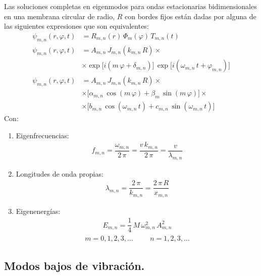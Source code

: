 Las soluciones completas en eigenmodos para ondas estacionarias bidimensionales en una membrana circular de radio, $R$ con bordes fijos están dadas por alguna de las siguientes expresiones que son equivalentes:
\begin{align*}
\psi_{m,n} (r ,\varphi, t) &= R_{m,n} (r) \, \Phi_{m} (\varphi) \, T_{m,n} (t) \\[0.5em] 
\psi_{m,n} (r ,\varphi, t) &= A_{m,n} \, J_{m,n} (k_{m,n} \, R) \times \\[0.5em]
&\times \exp\big[ i(m \, \varphi + \delta_{m,n}) \big] \, \exp\big[ i(\omega_{m,n} \, t + \varphi_{m,n}) \big] \\[0.5em]
\psi_{m,n} (r ,\varphi, t) &= A_{m,n} \, J_{m,n} (k_{m,n} \, R) \times \\[0.5em]
&\times \big[ \alpha_{m,n} \,  \cos (m \, \varphi) + \beta_{m} \, \sin (m \, \varphi) \big] \times \\[0.5em]
&\times \big[ b_{m,n} \,  \cos (\omega_{m,n} \, t) + c_{m,n} \, \sin (\omega_{m,n} \, t) \big]
\end{align*}   
Con:
\begin{enumerate}[label=\roman*)]
\item Eigenfrecuencias:
\begin{eqnarray*}
f_{m,n} = \dfrac{\omega_{m,n}}{2 \, \pi} =  \dfrac{v \, k_{m,n}}{2 \, \pi} =  \dfrac{v}{\lambda_{m,n}}
\end{eqnarray*}
\item Longitudes de onda propias:
\begin{eqnarray*}
\lambda_{m,n} = \dfrac{2 \, \pi}{k_{m,n}} =  \dfrac{2 \, \pi \, R}{x_{m,n}}
\end{eqnarray*}
\item Eigenenergías:
\begin{align*}
E_{m,n} = \dfrac{1}{4} \, M \, \omega_{m,n}^{2} \, A_{m,n}^{2}
\end{align*}
\begin{align*}
m = 0, 1, 2, 3, \ldots \hspace{1cm} n = 1, 2, 3, \ldots
\end{align*}
\end{enumerate}

\subsection{Modos bajos de vibración.}

